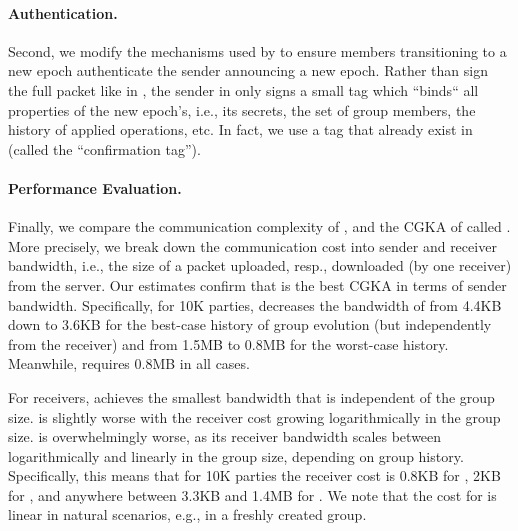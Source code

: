 \paragraph{Authentication.}
Second, we modify the mechanisms used by \protITK to ensure members
transitioning to a new epoch authenticate the sender announcing a new epoch.
Rather than sign the full packet like in \protITK, the sender in \saik only
signs a small tag which ``binds`` all properties of the new epoch's, i.e., its
secrets, the set of group members, the history of applied operations, etc.
In fact, we use a tag that already exist in \protITK (called the 
``confirmation tag'').

%


\paragraph{Performance Evaluation.}
Finally, we compare the communication complexity of \saik, \protITK and the CGKA of \cite{hashimoto2021cmpke} called \protCMPKE. More precisely, we break down the communication cost into sender and receiver bandwidth, i.e., the size of a packet uploaded, resp., downloaded (by one receiver) from the server.
%
Our estimates confirm that \saik is the best CGKA in terms of sender bandwidth. Specifically, for 10K parties, \saik decreases the bandwidth of \protITK from 4.4KB down to 3.6KB for the best-case history of group evolution (but independently from the receiver) and from 1.5MB to 0.8MB for the worst-case history. Meanwhile, \protCMPKE requires 0.8MB in all cases.

For receivers, \protCMPKE achieves the smallest bandwidth that is independent of the group size. \saik is slightly worse with the receiver cost growing logarithmically in the group size. \protITK is overwhelmingly worse, as its receiver bandwidth scales between logarithmically and linearly in the group size, depending on group history. Specifically, this means that for 10K parties the receiver cost is 0.8KB for \protCMPKE, 2KB for \saik, and anywhere between 3.3KB and 1.4MB for \protITK. We note that the cost for \protITK is linear in natural scenarios, e.g., in a freshly created group.


